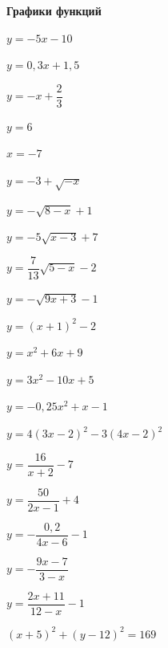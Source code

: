 \centerline{\bf \Huge Графики функций}

 $y=-5x-10$

 $y=0,3x+1,5$

 $y=-x+\dfrac{2}{3}$

 $y=6$

 $x=-7$

 $y=-3+\sqrt{-x}$

 $y=-\sqrt{8-x}+1$

 $y=-5\sqrt{x-3}+7$

 $y=\dfrac{7}{13}\sqrt{5-x}-2$

 $y=-\sqrt{9x+3}-1$

 $y=(x+1)^2-2$

 $y=x^2+6x+9$

 $y=3x^2-10x+5$

 $y=-0,25x^2+x-1$

 $y=4(3x-2)^2-3(4x-2)^2$

 $y=\dfrac{16}{x+2}-7$

 $y=\dfrac{50}{2x-1}+4$

 $y=-\dfrac{0,2}{4x-6}-1$

 $y=-\dfrac{9x-7}{3-x}$

 $y=\dfrac{2x+11}{12-x}-1$

 $(x+5)^2+(y-12)^2=169$